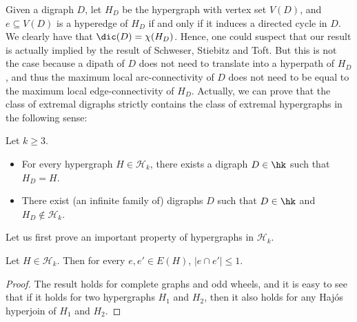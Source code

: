 Given a digraph $D$, let $H_D$ be the hypergraph with vertex set $V(D)$, and $e \subseteq  V(D)$ is a hyperedge of $H_D$ if and only if it induces a directed cycle in $D$. We clearly have that $\dic(D) = \chi(H_D)$. 
Hence, one could suspect that our result is actually implied by the result of Schweser,  Stiebitz and  Toft. But this is not the case because a dipath of $D$ does not need to translate into a hyperpath of $H_D$, and thus the maximum local arc-connectivity of $D$ does not need to be equal to the maximum local edge-connectivity of $H_D$.  Actually, we can prove that the class of extremal digraphs strictly contains the class of extremal hypergraphs in the following sense: 

\begin{lemma}\label{lem:digraphs>hypergraphs}
Let $k \geq 3$. 
    \begin{itemize}
    \item[(i)] For every hypergraph $H \in  \mathcal H_k$, there exists a digraph $D \in \hk$ such that  $H_D= H$. 
    \item[(ii)] There exist  (an infinite family of) digraphs $D$ such that $D \in \hk$ and  $H_D \notin  \mathcal H_k$.  
\end{itemize}
\end{lemma}

Let us first prove an important property of hypergraphs in $\mathcal H_k$. 

\begin{property}\label{prop:hypergraph_nul}    
Let $H \in \mathcal H_k$. Then for every $e,e' \in E(H)$, $|e\cap e'| \leq 1$.
\end{property}

\begin{proof}
    The result holds for complete graphs and odd wheels, and it is easy to see that if it holds for two hypergraphs $H_1$ and $H_2$, then it also holds for any Haj\'os hyperjoin of $H_1$ and $H_2$. 
\end{proof}

